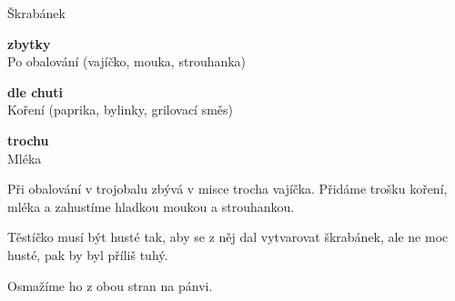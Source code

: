 \documentclass[11pt,a4paper]{article}
\begin{document}
\begin{recipe}[Beige]{Škrabánek}
    \begin{ingredients}
        \item \parbox[t]{\linewidth}{\raggedright \piece \textbf{zbytky}\\ Po obalování (vajíčko, mouka, strouhanka)}
        \item \parbox[t]{\linewidth}{\raggedright \indefinite \textbf{dle chuti}\\ Koření (paprika, bylinky, grilovací směs)}
        \item \parbox[t]{\linewidth}{\raggedright \liquid \textbf{trochu}\\ Mléka}
    \end{ingredients}
    \begin{steps}
        \item Při obalování v trojobalu zbývá v misce trocha vajíčka. Přidáme trošku koření, mléka a zahustíme hladkou moukou a strouhankou.
        \item Těstíčko musí být husté tak, aby se z něj dal vytvarovat škrabánek, ale ne moc husté, pak by byl příliš tuhý.
        \item Osmažíme ho z obou stran na pánvi.
    \end{steps}
\end{recipe}
\end{document}
